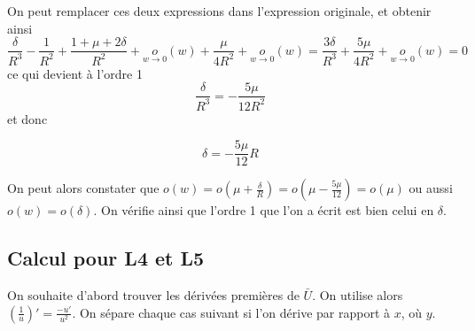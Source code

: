 \documentclass[20pt]{extarticle}
\theoremstyle{definition}
\theoremstyle{definition}
\begin{document}
	On peut remplacer ces deux expressions dans l'expression originale, et obtenir ainsi
	\begin{equation*}
		\frac{\delta}{R^3} - \frac{1}{R^2} + \frac{1+\mu+2\delta}{R^2} + \underset{w \to 0}{o}(w) + \frac{\mu}{4R^2} + \underset{w \to 0}{o}(w)
		= \frac{3\delta}{R^3} + \frac{5\mu}{4R^2} + \underset{w \to 0}{o}(w) = 0
	\end{equation*}
	ce qui devient à l'ordre 1
	\begin{equation*}
		\frac{\delta}{R^3} = -\frac{5\mu}{12R^2}
	\end{equation*}
	et donc
	\begin{tcolorbox}[colframe=black,boxrule=0.8pt,colback=white]
		\begin{equation*}
			\delta = - \frac{5\mu}{12}R
		\end{equation*}
	\end{tcolorbox}
	
	On peut alors constater que $o(w) = o(\mu + \frac{\delta}{R}) = o(\mu - \frac{5\mu}{12}) = o(\mu)$ ou aussi $o(w) = o(\delta)$. On vérifie ainsi que l'ordre 1 que l'on a écrit est bien celui en $\delta$.
	
	
	\clearpage
	\subsection*{Calcul pour L4 et L5}
	On souhaite d'abord trouver les dérivées premières de $\bar{U}$. On utilise alors $(\frac{1}{u})' = \frac{-u'}{u^2}$. On sépare chaque cas suivant si l'on dérive par rapport à $x$, où $y$.	
	\\
	
\end{document}
